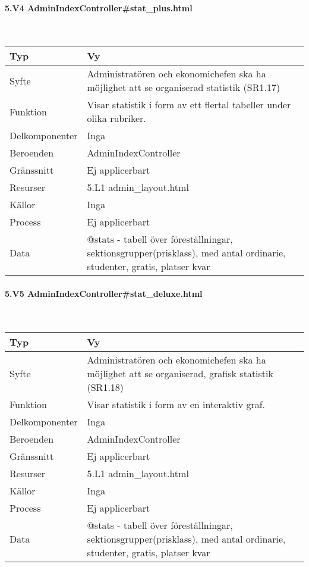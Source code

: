 \documentclass[a4paper, twoside, 11pt, titlepage]{article}
\begin{document}
			\paragraph{5.V4 AdminIndexController\#stat\_plus.html}\

			\begin {table} [ht] \begin{tabular} {  p{3.5cm} p{9.6cm} }
				\hline
				Typ & Vy  \\
				\hline
				Syfte & Administratören och ekonomichefen ska ha möjlighet att se organiserad statistik (SR1.17)  \\
				\hline
				Funktion & Visar statistik i form av ett flertal tabeller under olika rubriker.  \\
				\hline
				Delkomponenter & Inga  \\
				\hline
				Beroenden & AdminIndexController  \\
				\hline
				Gränssnitt & Ej applicerbart  \\
				\hline
				Resurser & 5.L1 admin\_layout.html  \\
				\hline
				Källor & Inga  \\
				\hline
				Process & Ej applicerbart  \\
				\hline
				Data & @stats - tabell över föreställningar, sektionsgrupper(prisklass), med antal ordinarie, studenter, gratis, platser kvar  \\
				\hline
			\end{tabular} \end{table} \FloatBarrier


			\paragraph{5.V5 AdminIndexController\#stat\_deluxe.html}\

			\begin {table} [ht] \begin{tabular} {  p{3.5cm} p{9.6cm} }
				\hline
				Typ & Vy  \\
				\hline
				Syfte & Administratören och ekonomichefen ska ha möjlighet att se organiserad, grafisk statistik (SR1.18)  \\
				\hline
				Funktion & Visar statistik i form av en interaktiv graf.  \\
				\hline
				Delkomponenter & Inga  \\
				\hline
				Beroenden & AdminIndexController  \\
				\hline
				Gränssnitt & Ej applicerbart  \\
				\hline
				Resurser & 5.L1 admin\_layout.html  \\
				\hline
				Källor & Inga  \\
				\hline
				Process & Ej applicerbart  \\
				\hline
				Data & @stats - tabell över föreställningar, sektionsgrupper(prisklass), med antal ordinarie, studenter, gratis, platser kvar  \\
				\hline
			\end{tabular} \end{table} \FloatBarrier
\end{document}
